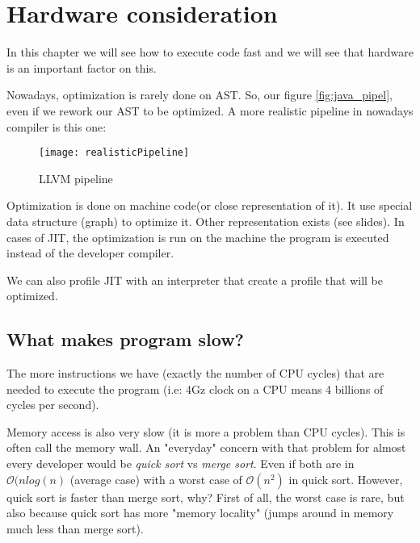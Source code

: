 \chapter{Hardware consideration}
\label{chap:hardware_consideration}
In this chapter we will see how to execute code fast and we will see that
hardware is an important factor on this.

Nowadays, optimization is rarely done on AST. So, our figure
\ref{fig:java_pipel}, even if we rework our AST to be optimized. A more
realistic pipeline in nowadays compiler is this one:
\begin{figure}[H]
     \centering
     \texttt{[image: realisticPipeline]}
     \caption{LLVM pipeline}
     \label{fig:llvm_pipeline}
\end{figure}

Optimization is done on machine code(or close representation of it). It use
special data structure (graph) to optimize it. Other representation exists (see
slides). In cases of JIT, the optimization is run on the machine the program is
executed instead of the developer compiler.

We can also profile JIT with an interpreter that create a profile that will be
optimized.

\section{What makes program slow?}
The more instructions we have (exactly the number of CPU cycles) that are needed
to execute the program (i.e: 4Gz clock on a CPU means 4 billions of cycles per
second).

Memory access is also very slow (it is more a problem than CPU cycles). This is
often call the memory wall. An "everyday" concern with that problem for almost
every developer would be \textit{quick sort} vs \textit{merge sort}. Even if
both are in $\mathcal{O}(n log(n)$ (average case) with a worst case of
$\mathcal{O}(n^2)$ in quick sort. However, quick sort is faster than merge sort,
why? First of all, the worst case is rare, but also because quick sort has more
"memory locality" (jumps around in memory much less than merge sort).

